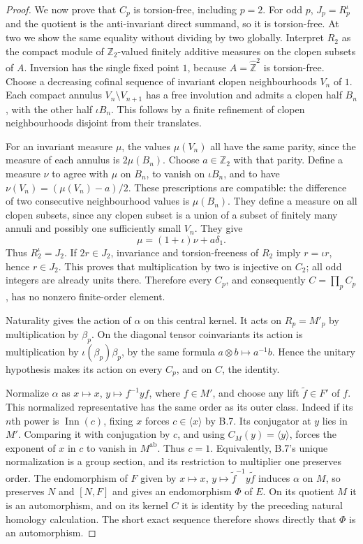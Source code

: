 \begin{proof}
We now prove that $C_p$ is torsion-free, including $p=2$.
For odd $p$, $J_p=R_p^{\iota}$ and the quotient is the
anti-invariant direct summand, so it is torsion-free. At two we
show the same equality without dividing by two globally. Interpret
$R_2$ as the compact module of $\mathbb Z_2$-valued finitely
additive measures on the clopen subsets of $A$. Inversion has the
single fixed point $1$, because $A=\widehat{\mathbb Z}^2$ is
torsion-free. Choose a decreasing cofinal sequence of invariant
clopen neighbourhoods $V_n$ of $1$. Each compact annulus
$V_n\setminus V_{n+1}$ has a free involution and admits a clopen
half $B_n$, with the other half $\iota B_n$. This follows by a
finite refinement of clopen neighbourhoods disjoint from their
translates.

For an invariant measure $\mu$, the values $\mu(V_n)$ all have
the same parity, since the measure of each annulus is
$2\mu(B_n)$. Choose $a\in\mathbb Z_2$ with that parity. Define
a measure $\nu$ to agree with $\mu$ on $B_n$, to vanish on
$\iota B_n$, and to have
$\nu(V_n)=(\mu(V_n)-a)/2$. These prescriptions are compatible:
the difference of two consecutive neighbourhood values is
$\mu(B_n)$. They define a measure on all clopen subsets, since
any clopen subset is a union of a subset of finitely many annuli
and possibly one sufficiently small $V_n$. They give
\[
                    \mu=(1+\iota)\nu+a\delta_1.
\]
Thus $R_2^{\iota}=J_2$. If $2r\in J_2$, invariance and
torsion-freeness of $R_2$ imply $r=\iota r$, hence $r\in J_2$.
This proves that multiplication by two is injective on $C_2$;
all odd integers are already units there. Therefore every $C_p$,
and consequently $C=\prod_p C_p$, has no nonzero finite-order
element.

Naturality gives the action of $\alpha$ on this central kernel.
It acts on $R_p=M'_p$ by multiplication by $\beta_p$. On the
diagonal tensor coinvariants its action is multiplication by
$\iota(\beta_p)\beta_p$, by the same formula
$a\otimes b\mapsto a^{-1}b$. Hence the unitary hypothesis makes
its action on every $C_p$, and on $C$, the identity.

Normalize $\alpha$ as $x\mapsto x$,
$y\mapsto f^{-1}yf$, where $f\in M'$, and choose any lift
$\widetilde f\in F'$ of $f$. This normalized representative has
the same order as its outer class. Indeed if its $n$th power is
$\operatorname{Inn}(c)$, fixing $x$ forces $c\in\langle x\rangle$
by B.7. Its conjugator at $y$ lies in $M'$. Comparing it with
conjugation by $c$, and using $C_M(y)=\langle y\rangle$, forces
the exponent of $x$ in $c$ to vanish in $M^{\mathrm{ab}}$.
Thus $c=1$. Equivalently, B.7's unique normalization is a group
section, and its restriction to multiplier one preserves order.
The endomorphism of $F$ given by
$x\mapsto x$, $y\mapsto\widetilde f^{-1}y\widetilde f$ induces
$\alpha$ on $M$, so preserves $N$ and $[N,F]$ and gives an
endomorphism $\Phi$ of $E$. On its quotient $M$ it is an
automorphism, and on its kernel $C$ it is identity by the preceding
natural homology calculation. The short exact sequence therefore
shows directly that $\Phi$ is an automorphism.


\end{proof}
